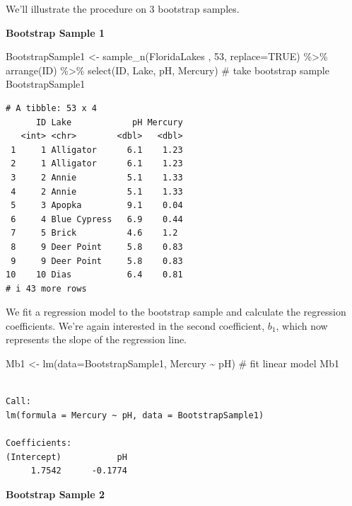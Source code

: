 \documentclass[
  letterpaper,
  DIV=11,
  numbers=noendperiod]{scrreprt}
\newenvironment{Shaded}{\begin{snugshade}}{\end{snugshade}}
\newcommand{\AttributeTok}[1]{\textcolor[rgb]{0.40,0.45,0.13}{#1}}
\newcommand{\CommentTok}[1]{\textcolor[rgb]{0.37,0.37,0.37}{#1}}
\newcommand{\ConstantTok}[1]{\textcolor[rgb]{0.56,0.35,0.01}{#1}}
\newcommand{\DecValTok}[1]{\textcolor[rgb]{0.68,0.00,0.00}{#1}}
\newcommand{\FunctionTok}[1]{\textcolor[rgb]{0.28,0.35,0.67}{#1}}
\newcommand{\NormalTok}[1]{\textcolor[rgb]{0.00,0.23,0.31}{#1}}
\newcommand{\OtherTok}[1]{\textcolor[rgb]{0.00,0.23,0.31}{#1}}
\newcommand{\SpecialCharTok}[1]{\textcolor[rgb]{0.37,0.37,0.37}{#1}}
\begin{document}
We'll illustrate the procedure on 3 bootstrap samples.

\textbf{Bootstrap Sample 1}

\begin{Shaded}
\begin{Highlighting}[]
\NormalTok{BootstrapSample1 }\OtherTok{\textless{}{-}} \FunctionTok{sample\_n}\NormalTok{(FloridaLakes , }\DecValTok{53}\NormalTok{, }\AttributeTok{replace=}\ConstantTok{TRUE}\NormalTok{)  }\SpecialCharTok{\%\textgreater{}\%} \FunctionTok{arrange}\NormalTok{(ID) }\SpecialCharTok{\%\textgreater{}\%} 
  \FunctionTok{select}\NormalTok{(ID, Lake, pH, Mercury)   }\CommentTok{\# take bootstrap sample}
\NormalTok{BootstrapSample1}
\end{Highlighting}
\end{Shaded}

\begin{verbatim}
# A tibble: 53 x 4
      ID Lake            pH Mercury
   <int> <chr>        <dbl>   <dbl>
 1     1 Alligator      6.1    1.23
 2     1 Alligator      6.1    1.23
 3     2 Annie          5.1    1.33
 4     2 Annie          5.1    1.33
 5     3 Apopka         9.1    0.04
 6     4 Blue Cypress   6.9    0.44
 7     5 Brick          4.6    1.2 
 8     9 Deer Point     5.8    0.83
 9     9 Deer Point     5.8    0.83
10    10 Dias           6.4    0.81
# i 43 more rows
\end{verbatim}

We fit a regression model to the bootstrap sample and calculate the
regression coefficients. We're again interested in the second
coefficient, \(b_1\), which now represents the slope of the regression
line.

\begin{Shaded}
\begin{Highlighting}[]
\NormalTok{Mb1 }\OtherTok{\textless{}{-}} \FunctionTok{lm}\NormalTok{(}\AttributeTok{data=}\NormalTok{BootstrapSample1, Mercury }\SpecialCharTok{\textasciitilde{}}\NormalTok{ pH) }\CommentTok{\# fit linear model}
\NormalTok{Mb1}
\end{Highlighting}
\end{Shaded}

\begin{verbatim}

Call:
lm(formula = Mercury ~ pH, data = BootstrapSample1)

Coefficients:
(Intercept)           pH  
     1.7542      -0.1774  
\end{verbatim}

\textbf{Bootstrap Sample 2}
\end{document}

